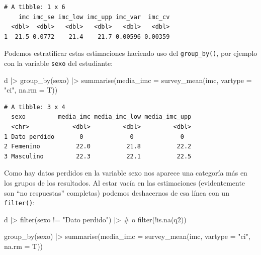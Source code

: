 \documentclass[
  spanish,
  a4paper,
]{scrbook}
\newenvironment{Shaded}{\begin{snugshade}}{\end{snugshade}}
\newcommand{\AttributeTok}[1]{\textcolor[rgb]{0.40,0.45,0.13}{#1}}
\newcommand{\CommentTok}[1]{\textcolor[rgb]{0.37,0.37,0.37}{#1}}
\newcommand{\FunctionTok}[1]{\textcolor[rgb]{0.28,0.35,0.67}{#1}}
\newcommand{\NormalTok}[1]{\textcolor[rgb]{0.00,0.23,0.31}{#1}}
\newcommand{\SpecialCharTok}[1]{\textcolor[rgb]{0.37,0.37,0.37}{#1}}
\newcommand{\StringTok}[1]{\textcolor[rgb]{0.13,0.47,0.30}{#1}}
\begin{document}
\begin{verbatim}
# A tibble: 1 x 6
    imc imc_se imc_low imc_upp imc_var  imc_cv
  <dbl>  <dbl>   <dbl>   <dbl>   <dbl>   <dbl>
1  21.5 0.0772    21.4    21.7 0.00596 0.00359
\end{verbatim}

Podemos estratificar estas estimaciones haciendo uso del
\texttt{group\_by()}, por ejemplo con la variable \texttt{sexo} del
estudiante:

\begin{Shaded}
\begin{Highlighting}[]
\NormalTok{d }\SpecialCharTok{|\textgreater{}}
  \FunctionTok{group\_by}\NormalTok{(sexo) }\SpecialCharTok{|\textgreater{}}
  \FunctionTok{summarise}\NormalTok{(}\AttributeTok{media\_imc =} \FunctionTok{survey\_mean}\NormalTok{(imc, }\AttributeTok{vartype =} \StringTok{"ci"}\NormalTok{, }\AttributeTok{na.rm =}\NormalTok{ T))}
\end{Highlighting}
\end{Shaded}

\begin{verbatim}
# A tibble: 3 x 4
  sexo         media_imc media_imc_low media_imc_upp
  <chr>            <dbl>         <dbl>         <dbl>
1 Dato perdido       0             0             0  
2 Femenino          22.0          21.8          22.2
3 Masculino         22.3          22.1          22.5
\end{verbatim}

Como hay datos perdidos en la variable sexo nos aparece una categoría
más en los grupos de los resultados. Al estar vacía en las estimaciones
(evidentemente son ``no respuestas'' completas) podemos deshacernos de
esa línea con un \texttt{filter()}:

\begin{Shaded}
\begin{Highlighting}[]
\NormalTok{d }\SpecialCharTok{|\textgreater{}}
  \FunctionTok{filter}\NormalTok{(sexo }\SpecialCharTok{!=} \StringTok{"Dato perdido"}\NormalTok{) }\SpecialCharTok{|\textgreater{}} \CommentTok{\# o filter(!is.na(q2))}

  \FunctionTok{group\_by}\NormalTok{(sexo) }\SpecialCharTok{|\textgreater{}}
  \FunctionTok{summarise}\NormalTok{(}\AttributeTok{media\_imc =} \FunctionTok{survey\_mean}\NormalTok{(imc, }\AttributeTok{vartype =} \StringTok{"ci"}\NormalTok{, }\AttributeTok{na.rm =}\NormalTok{ T))}
\end{Highlighting}
\end{Shaded}
\end{document}
